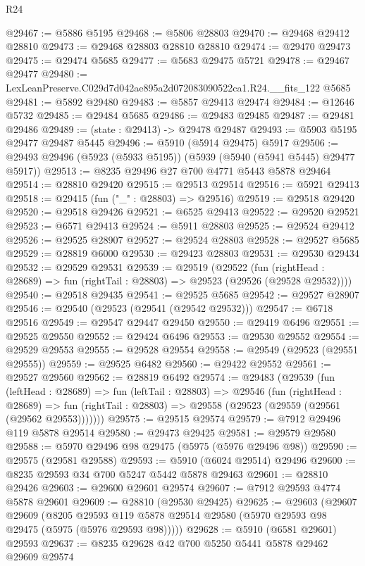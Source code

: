 \begin{lexlean}{R24}
\begin{coremodule}
@29467 := @5886 @5195
@29468 := @5806 @28803
@29470 := @29468 @29412 @28810
@29473 := @29468 @28803 @28810 @28810
@29474 := @29470 @29473
@29475 := @29474 @5685
@29477 := @5683 @29475 @5721
@29478 := @29467 @29477
@29480 := LexLeanPreserve.C029d7d042ae895a2d072083090522ca1.R24.__fits_122 @5685
@29481 := @5892 @29480
@29483 := @5857 @29413 @29474
@29484 := @12646 @5732
@29485 := @29484 @5685
@29486 := @29483 @29485
@29487 := @29481 @29486
@29489 := (state : @29413) -> @29478 @29487
@29493 := @5903 @5195 @29477 @29487 @5445
@29496 := @5910 (@5914 @29475) @5917
@29506 := @29493 @29496 (@5923 (@5933 @5195)) (@5939 (@5940 (@5941 @5445) @29477 @5917))
@29513 := @8235 @29496 @27 @700 @4771 @5443 @5878 @29464
@29514 := @28810 @29420
@29515 := @29513 @29514
@29516 := @5921 @29413
@29518 := @29415 (fun ("_" : @28803) => @29516)
@29519 := @29518 @29420
@29520 := @29518 @29426
@29521 := @6525 @29413
@29522 := @29520 @29521
@29523 := @6571 @29413
@29524 := @5911 @28803
@29525 := @29524 @29412
@29526 := @29525 @28907
@29527 := @29524 @28803
@29528 := @29527 @5685
@29529 := @28819 @6000
@29530 := @29423 @28803
@29531 := @29530 @29434
@29532 := @29529 @29531
@29539 := @29519
    (@29522
      (fun (rightHead : @28689) => fun (rightTail : @28803) => @29523 (@29526 (@29528 @29532))))
@29540 := @29518 @29435
@29541 := @29525 @5685
@29542 := @29527 @28907
@29546 := @29540 (@29523 (@29541 (@29542 @29532)))
@29547 := @6718 @29516
@29549 := @29547 @29447 @29450
@29550 := @29419 @6496
@29551 := @29525 @29550
@29552 := @29424 @6496
@29553 := @29530 @29552
@29554 := @29529 @29553
@29555 := @29528 @29554
@29558 := @29549 (@29523 (@29551 @29555))
@29559 := @29525 @6482
@29560 := @29422 @29552
@29561 := @29527 @29560
@29562 := @28819 @6492
@29574 := @29483
    (@29539
      (fun (leftHead : @28689) =>
      fun (leftTail : @28803) =>
      @29546
        (fun (rightHead : @28689) =>
        fun (rightTail : @28803) => @29558 (@29523 (@29559 (@29561 (@29562 @29553)))))))
@29575 := @29515 @29574
@29579 := @7912 @29496 @119 @5878 @29514
@29580 := @29473 @29425
@29581 := @29579 @29580
@29588 := @5970 @29496 @98 @29475 (@5975 (@5976 @29496 @98))
@29590 := @29575 (@29581 @29588)
@29593 := @5910 (@6024 @29514) @29496
@29600 := @8235 @29593 @34 @700 @5247 @5442 @5878 @29463
@29601 := @28810 @29426
@29603 := @29600 @29601 @29574
@29607 := @7912 @29593 @4774 @5878 @29601
@29609 := @28810 (@29530 @29425)
@29625 := @29603
    (@29607
      @29609
      (@8205 @29593 @119 @5878 @29514 @29580 (@5970 @29593 @98 @29475 (@5975 (@5976 @29593 @98)))))
@29628 := @5910 (@6581 @29601) @29593
@29637 := @8235 @29628 @42 @700 @5250 @5441 @5878 @29462 @29609 @29574

\end{coremodule}
\end{lexlean}
